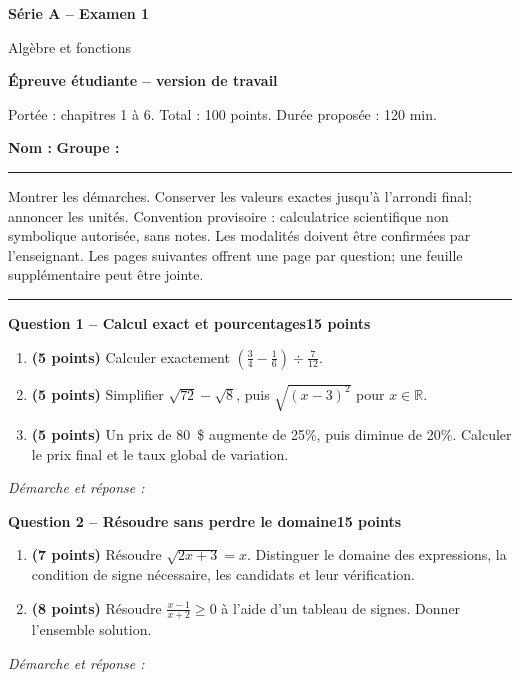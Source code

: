 \documentclass[11pt,a4paper]{article}
\begin{document}
{\LARGE\bfseries Série A -- Examen 1}\par
{\large Algèbre et fonctions}\par
\textbf{Épreuve étudiante -- version de travail}\par
Portée : chapitres 1 à 6. Total : 100 points. Durée proposée : 120 min.\par
\textbf{Nom :} \hrulefill\quad \textbf{Groupe :} \rule{22mm}{0.3pt}\par
\small Montrer les démarches. Conserver les valeurs exactes jusqu’à l’arrondi final; annoncer les unités. Convention provisoire : calculatrice scientifique non symbolique autorisée, sans notes. Les modalités doivent être confirmées par l’enseignant. Les pages suivantes offrent une page par question; une feuille supplémentaire peut être jointe.\normalsize\par
\vspace{3mm}\hrule\vspace{4mm}
{\large\bfseries Question 1 -- Calcul exact et pourcentages}\hfill\textbf{15 points}\par
\begin{enumerate}
\item \textbf{(5 points)} Calculer exactement \(\left(\frac34-\frac16\right)\div\frac7{12}\).
\item \textbf{(5 points)} Simplifier \(\sqrt{72}-\sqrt8\), puis \(\sqrt{(x-3)^2}\) pour \(x\in\mathbb R\).
\item \textbf{(5 points)} Un prix de 80~\$ augmente de 25\%, puis diminue de 20\%. Calculer le prix final et le taux global de variation.
\end{enumerate}
\vspace{3mm}\textit{Démarche et réponse :}\par\vfill

\newpage
{\large\bfseries Question 2 -- Résoudre sans perdre le domaine}\hfill\textbf{15 points}\par
\begin{enumerate}
\item \textbf{(7 points)} Résoudre \(\sqrt{2x+3}=x\). Distinguer le domaine des expressions, la condition de signe nécessaire, les candidats et leur vérification.
\item \textbf{(8 points)} Résoudre \(\frac{x-1}{x+2}\ge0\) à l’aide d’un tableau de signes. Donner l’ensemble solution.
\end{enumerate}
\vspace{3mm}\textit{Démarche et réponse :}\par\vfill
\end{document}
